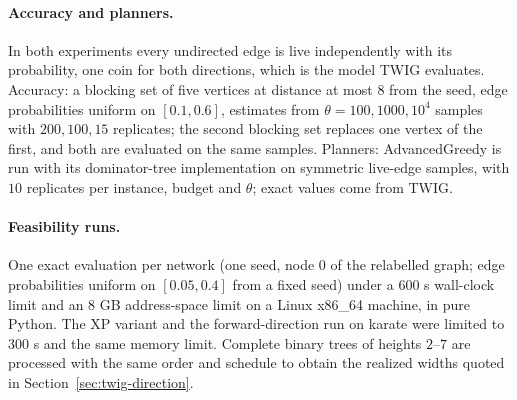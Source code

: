 \documentclass[11pt]{article}
\theoremstyle{definition}
\theoremstyle{remark}
\begin{document}
\paragraph{Accuracy and planners.} In both experiments every undirected edge is live independently with its probability, one coin for both directions, which is the model TWIG evaluates. Accuracy: a blocking set of five vertices at distance at most $8$ from the seed, edge probabilities uniform on $[0.1,0.6]$, estimates from $\theta=100,1000,10^4$ samples with $200,100,15$ replicates; the second blocking set replaces one vertex of the first, and both are evaluated on the same samples. Planners: AdvancedGreedy is run with its dominator-tree implementation on symmetric live-edge samples, with $10$ replicates per instance, budget and $\theta$; exact values come from TWIG.

\paragraph{Feasibility runs.} One exact evaluation per network (one seed, node $0$ of the relabelled graph; edge probabilities uniform on $[0.05,0.4]$ from a fixed seed) under a 600 s wall-clock limit and an 8 GB address-space limit on a Linux x86\_64 machine, in pure Python. The XP variant and the forward-direction run on karate were limited to 300 s and the same memory limit. Complete binary trees of heights $2$--$7$ are processed with the same order and schedule to obtain the realized widths quoted in Section~\ref{sec:twig-direction}.
\end{document}
